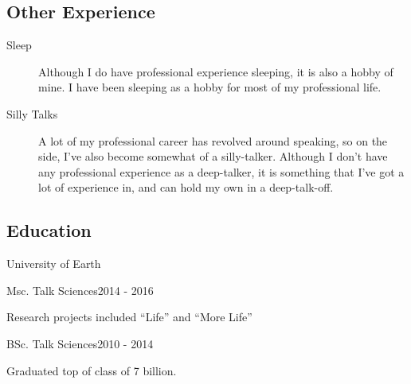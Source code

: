 \documentclass[pdftex,letterpaper,10pt]{article}
\begin{document}
\subsection*{Other Experience}
\begin{description}
    \item[Sleep] Although I do have professional experience sleeping, it is also a hobby of mine.
        I have been sleeping as a hobby for most of my professional life.
    \item[Silly Talks] A lot of my professional career has revolved around speaking, so on the side, I've also become somewhat of a silly-talker.
        Although I don't have any professional experience as a deep-talker, it is something that I've got a lot of experience in, and can hold my own in a deep-talk-off.
\end{description}
%
\subsection*{Education}
\begin{school}{University of Earth}
    \begin{degree}{Msc. Talk Sciences}{2014 - 2016}
        \item Research projects included ``Life'' and ``More Life''
    \end{degree}
    \begin{degree}{BSc. Talk Sciences}{2010 - 2014}
        \item Graduated top of class of 7 billion.
    \end{degree}
\end{school}
%
\end{document}
